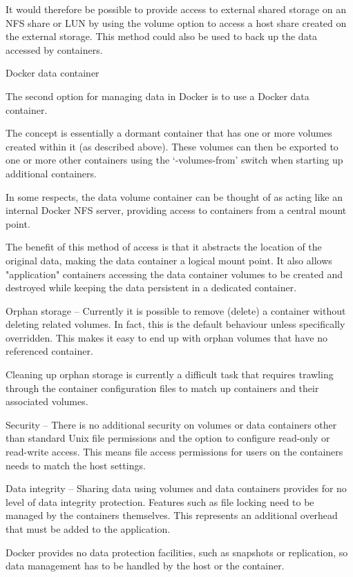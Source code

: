 It would therefore be possible to provide access to external shared storage on an NFS share or LUN by using the volume option to access a host share created on the external storage. This method could also be used to back up the data accessed by containers.

Docker data container

The second option for managing data in Docker is to use a Docker data container.

The concept is essentially a dormant container that has one or more volumes created within it (as described above). These volumes can then be exported to one or more other containers using the ‘-volumes-from’ switch when starting up additional containers.

In some respects, the data volume container can be thought of as acting like an internal Docker NFS server, providing access to containers from a central mount point.


The benefit of this method of access is that it abstracts the location of the original data, making the data container a logical mount point. It also allows "application" containers accessing the data container volumes to be created and destroyed while keeping the data persistent in a dedicated container.



Orphan storage -- Currently it is possible to remove (delete) a container without deleting related volumes. In fact, this is the default behaviour unless specifically overridden. This makes it easy to end up with orphan volumes that have no referenced container.

Cleaning up orphan storage is currently a difficult task that requires trawling through the container configuration files to match up containers and their associated volumes.


Security -- There is no additional security on volumes or data containers other than standard Unix file permissions and the option to configure read-only or read-write access. This means file access permissions for users on the containers needs to match the host settings.

Data integrity -- Sharing data using volumes and data containers provides for no level of data integrity protection. Features such as file locking need to be managed by the containers themselves. This represents an additional overhead that must be added to the application. 

Docker provides no data protection facilities, such as snapshots or replication, so data management has to be handled by the host or the container.

